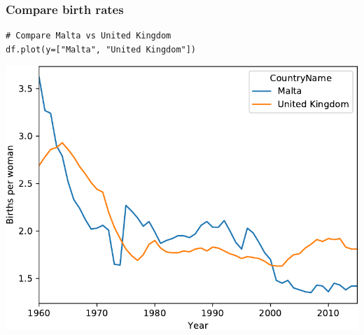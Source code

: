 \documentclass[pdf]{beamer}
\begin{document}
\begin{frame}[fragile]
\frametitle{Compare birth rates}

\begin{lstlisting}[style=python]
# Compare Malta vs United Kingdom
df.plot(y=["Malta", "United Kingdom"])
\end{lstlisting}

\vspace{-0.6cm}
\begin{center}
	\includegraphics[width=.7\textwidth]{compare_births.pdf}
\end{center}

\end{frame}

\end{document}
